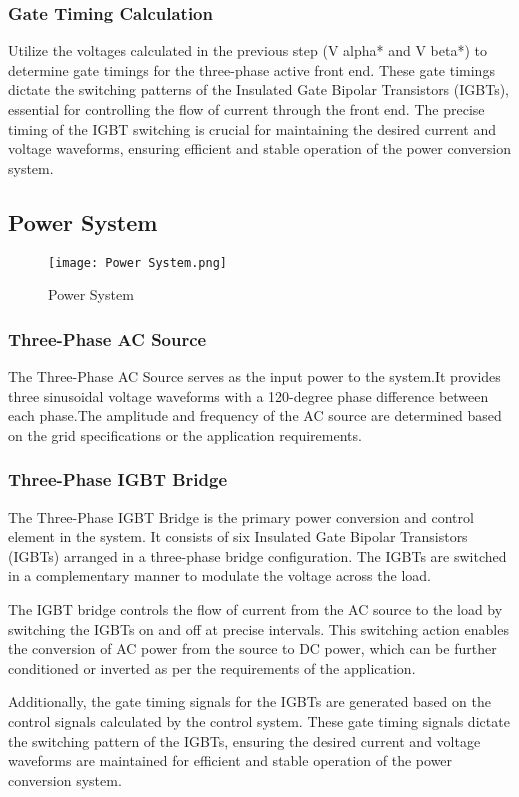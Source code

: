 \subsubsection{Gate Timing Calculation}
Utilize the voltages calculated in the previous step (V alpha* and V beta*) to
determine gate timings for the three-phase active front end. These gate timings
dictate the switching patterns of the Insulated Gate Bipolar Transistors
(IGBTs), essential for controlling the flow of current through the front end.
The precise timing of the IGBT switching is crucial for maintaining the desired
current and voltage waveforms, ensuring efficient and stable operation of the
power conversion system.

\subsection{Power System}
\begin{figure}[h]
    \centering
    \texttt{[image: Power System.png]}
    \caption{Power System}
    \label{fig:Power System}
\end{figure}

\subsubsection{Three-Phase AC Source}
The Three-Phase AC Source serves as the input power to the system.It provides
three sinusoidal voltage waveforms with a 120-degree phase difference between
each phase.The amplitude and frequency of the AC source are determined based on
the grid specifications or the application requirements.
\subsubsection{Three-Phase IGBT Bridge}
The Three-Phase IGBT Bridge is the primary power conversion and control element
in the system. It consists of six Insulated Gate Bipolar Transistors (IGBTs)
arranged in a three-phase bridge configuration. The IGBTs are switched in a
complementary manner to modulate the voltage across the load.

The IGBT bridge controls the flow of current from the AC source to the load by
switching the IGBTs on and off at precise intervals. This switching action
enables the conversion of AC power from the source to DC power, which can be
further conditioned or inverted as per the requirements of the application.

Additionally, the gate timing signals for the IGBTs are generated based on the
control signals calculated by the control system. These gate timing signals
dictate the switching pattern of the IGBTs, ensuring the desired current and
voltage waveforms are maintained for efficient and stable operation of the
power conversion system.

